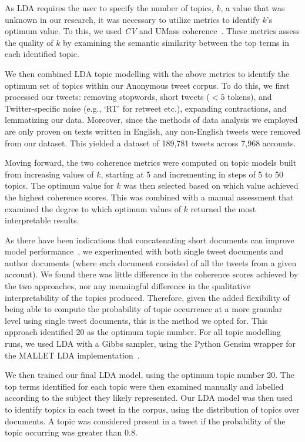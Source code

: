 \documentclass[letterpaper]{article}
\begin{document}
As LDA requires the user to specify the number of topics, $k$, a value that was unknown in our research, it was necessary to utilize metrics to identify $k$'s optimum value. To this, we used \textit{CV} and UMass coherence~\cite{Syed2017}. These metrics assess the quality of $k$ by examining the semantic similarity between the top terms in each identified topic.

We then combined LDA topic modelling with the above metrics to identify the optimum set of topics within our Anonymous tweet corpus. To do this, we first processed our tweets: removing stopwords, short tweets ($<5$ tokens), and Twitter-specific noise (e.g., `RT' for retweet etc.), expanding contractions, and lemmatizing our data. Moreover, since the methods of data analysis we employed are only proven on texts written in English, any non-English tweets were removed from our dataset. This yielded a dataset of 189,781 tweets across 7,968 accounts.

Moving forward, the two coherence metrics were computed on topic models built from increasing values of $k$, starting at 5 and incrementing in steps of 5 to 50 topics. The optimum value for $k$ was then selected based on which value achieved the highest coherence scores. This was combined with a manual assessment that examined the degree to which optimum values of $k$ returned the most interpretable results.

As there have been indications that concatenating short documents can improve model performance~\cite{Kigerl2018}, we experimented with both single tweet documents and author documents (where each document consisted of all the tweets from a given account). We found there was little difference in the coherence scores achieved by the two approaches, nor any meaningful difference in the qualitative interpretability of the topics produced. Therefore, given the added flexibility of being able to compute the probability of topic occurrence at a more granular level using single tweet documents, this is the method we opted for. This approach identified 20 as the optimum topic number. For all topic modelling runs, we used LDA with a Gibbs sampler, using the Python Gensim wrapper for the MALLET LDA implementation~\cite{Gensim}.

We then trained our final LDA model, using the optimum topic number 20. The top terms identified for each topic were then examined manually and labelled according to the subject they likely represented. Our LDA model was then used to identify topics in each tweet in the corpus, using the distribution of topics over documents. A topic was considered present in a tweet if the probability of the topic occurring was greater than 0.8.
\end{document}
